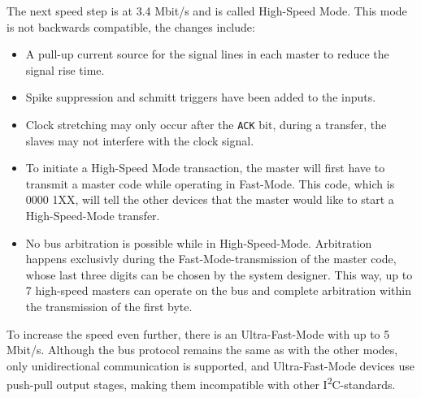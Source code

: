 \documentclass[journal]{IEEEtran}
\newcommand{\twi}{I\textsuperscript{2}C\xspace}
\newcommand{\ack}{\texttt{ACK}\xspace}
\begin{document}
The next speed step is at 3.4 Mbit/s and is called High-Speed Mode. This mode is not backwards compatible, the changes include:
\begin{itemize}
	\item A pull-up current source for the signal lines in each master to reduce the signal rise time.
	\item Spike suppression and schmitt triggers have been added to the inputs.
	\item Clock stretching may only occur after the \ack bit, during a transfer, the slaves may not interfere with the clock signal.
	\item To initiate a High-Speed Mode transaction, the master will first have to transmit a master code while operating in Fast-Mode. This code, which is 0000 1XX, will tell the other devices that the master would like to start a High-Speed-Mode transfer.
	\item No bus arbitration is possible while in High-Speed-Mode. Arbitration happens exclusivly during the Fast-Mode-transmission of the master code, whose last three digits can be chosen by the system designer. This way, up to 7  high-speed masters can operate on the bus and complete arbitration within the transmission of the first byte.
\end{itemize}

To increase the speed even further, there is an Ultra-Fast-Mode with up to 5 Mbit/s. Although the bus protocol remains the same as with the other modes, only unidirectional communication is supported, and Ultra-Fast-Mode devices use push-pull output stages, making them incompatible with other \twi-standards.
\end{document}
